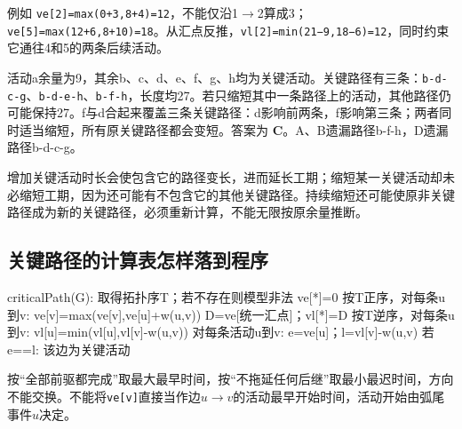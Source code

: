 例如 \texttt{ve[2]=\allowbreak{}max(\allowbreak{}0+\allowbreak{}3,\allowbreak{}8+\allowbreak{}4)\allowbreak{}=\allowbreak{}12}，不能仅沿1\ensuremath{\to}2算成3；\texttt{ve[5]=\allowbreak{}max(\allowbreak{}12+\allowbreak{}6,\allowbreak{}8+\allowbreak{}10)\allowbreak{}=\allowbreak{}18}。从汇点反推，\texttt{vl[2]=\allowbreak{}min(\allowbreak{}21−9,\allowbreak{}18−6)\allowbreak{}=\allowbreak{}12}，同时约束它通往4和5的两条后续活动。

活动a余量为9，其余b、c、d、e、f、g、h均为关键活动。关键路径有三条：\texttt{b-d-c-g}、\texttt{b-d-e-h}、\texttt{b-f-h}，长度均27。若只缩短其中一条路径上的活动，其他路径仍可能保持27。f与d合起来覆盖三条关键路径：d影响前两条，f影响第三条；两者同时适当缩短，所有原关键路径都会变短。答案为 \textbf{C}。A、B遗漏路径b-f-h，D遗漏路径b-d-c-g。

增加关键活动时长会使包含它的路径变长，进而延长工期；缩短某一关键活动却未必缩短工期，因为还可能有不包含它的其他关键路径。持续缩短还可能使原非关键路径成为新的关键路径，必须重新计算，不能无限按原余量推断。

\subsection{关键路径的计算表怎样落到程序}\label{DS06-aoe-code}

\begin{codeblock}[language={}]
criticalPath(G):
    取得拓扑序T；若不存在则模型非法
    ve[*]=0
    按T正序，对每条u到v: ve[v]=max(ve[v],ve[u]+w(u,v))
    D=ve[统一汇点]；vl[*]=D
    按T逆序，对每条u到v: vl[u]=min(vl[u],vl[v]-w(u,v))
    对每条活动u到v:
        e=ve[u]；l=vl[v]-w(u,v)
        若e==l: 该边为关键活动
\end{codeblock}

按``全部前驱都完成''取最大最早时间，按``不拖延任何后继''取最小最迟时间，方向不能交换。不能将\texttt{ve[v]}直接当作边\(u\to v\)的活动最早开始时间，活动开始由弧尾事件\(u\)决定。

